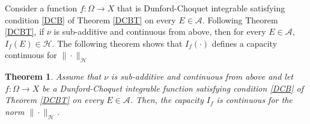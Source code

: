 \documentclass[preprint,authoryear,12pt]{article}%
\newtheorem{theorem}{Theorem}
\theoremstyle{definition}
\renewcommand{\AA}{{\mathcal A}}
\newcommand{\HH}{{\mathcal H}}
\begin{document}
 
Consider a function $f:\Omega\rightarrow X$ that is Dunford-Choquet integrable satisfying condition \eqref{DCB} of Theorem \ref{DCBT} on every $E\in \AA$. Following Theorem \ref{DCBT}, if $\nu$ is sub-additive and continuous from above, then for every $E\in \AA$, $I_f(E)\in \HH$. The following theorem shows that $ I_f(\cdot)$ defines a capacity continuous for $\|\cdot \|_\HH$  


\begin{theorem}\label{TCON} Assume that $\nu$ is sub-additive and continuous from above and let  $f:\Omega\rightarrow X$ be a Dunford-Choquet integrable function satisfying condition \eqref{DCB} of Theorem \ref{DCBT} on every $E\in \AA$. Then, the capacity $I_f$ is continuous for the norm $\|\cdot\|_\HH$.
\end{theorem}

\end{document}
